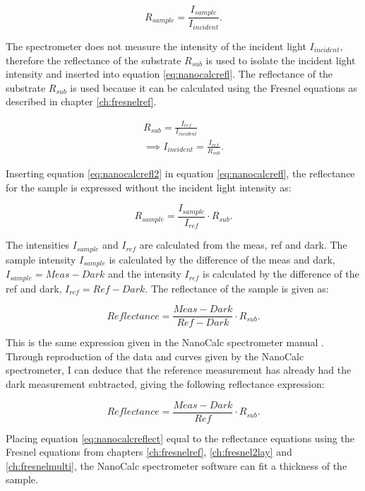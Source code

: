 \documentclass[MasterThesisMain.tex]{subfiles}
\begin{document}
\begin{equation}\label{eq:nanocalcrefl}
R_{sample} = \frac{I_{sample}}{I_{incident}}.
\end{equation}

The spectrometer does not measure the intensity of the incident light $I_{incident}$, therefore the reflectance of the substrate $R_{sub}$ is used to isolate the incident light intensity and inserted into equation \ref{eq:nanocalcrefl}. The reflectance of the substrate $R_{sub}$ is used because it can be calculated using the Fresnel equations as described in chapter \ref{ch:fresnelref}.

\begin{align}
R_{sub} = \frac{I_{ref}}{I_{incident}}\\
\implies  I_{incident} = \frac{I_{ref}}{R_{sub}} \label{eq:nanocalcrefl2}.
\end{align}

Inserting equation \ref{eq:nanocalcrefl2} in equation \ref{eq:nanocalcrefl}, the reflectance for the sample is expressed without the incident light intensity as:

\begin{equation}
R_{sample} = \frac{I_{sample}}{I_{ref}} \cdot R_{sub}.
\end{equation}

The intensities $I_{sample}$ and $I_{ref}$ are calculated from the meas, ref and dark. The sample intensity $I_{sample}$ is calculated by the difference of the meas and dark, $I_{sample}=Meas-Dark$ and the intensity $I_{ref}$ is calculated by the difference of the ref and dark, $I_{ref}=Ref-Dark$. The reflectance of the sample is given as:

\begin{equation}
Reflectance = \frac{Meas-Dark}{Ref-Dark} \cdot R_{sub}.
\end{equation}

This is the same expression given in the NanoCalc spectrometer manual \cite{nanocalcmanual}. Through reproduction of the data and curves given by the NanoCalc spectrometer, I can deduce that the reference measurement has already had the dark measurement subtracted, giving the following reflectance expression:

\begin{equation}\label{eq:nanocalcreflect}
Reflectance = \frac{Meas-Dark}{Ref} \cdot R_{sub}.
\end{equation}

Placing equation \ref{eq:nanocalcreflect} equal to the reflectance equations using the Fresnel equations from chapters  \ref{ch:fresnelref}, \ref{ch:fresnel2lay} and \ref{ch:fresnelmulti}, the NanoCalc spectrometer software can fit a thickness of the sample.
\end{document}
